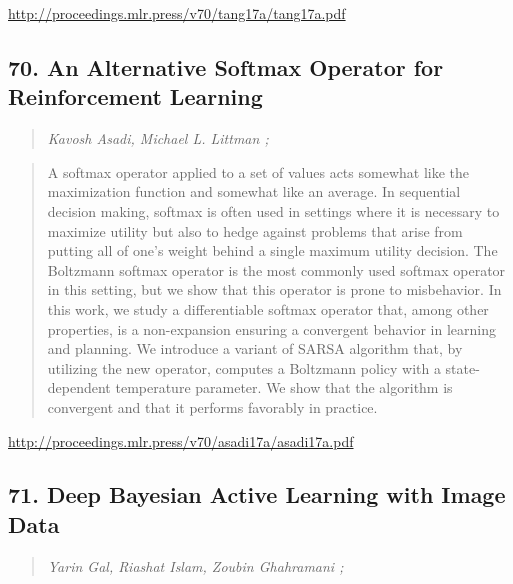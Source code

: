 \documentclass{article}
\begin{document}
\href{http://proceedings.mlr.press/v70/tang17a/tang17a.pdf}{http://proceedings.mlr.press/v70/tang17a/tang17a.pdf}

\subsection{70. An Alternative Softmax Operator for Reinforcement Learning}

\begin{quote}
\footnotesize{\textit{Kavosh Asadi, Michael L. Littman ;}}

\end{quote}

\begin{quote}
    A softmax operator applied to a set of values acts somewhat like the maximization function and somewhat like an average. In sequential decision making, softmax is often used in settings where it is necessary to maximize utility but also to hedge against problems that arise from putting all of one’s weight behind a single maximum utility decision. The Boltzmann softmax operator is the most commonly used softmax operator in this setting, but we show that this operator is prone to misbehavior. In this work, we study a differentiable softmax operator that, among other properties, is a non-expansion ensuring a convergent behavior in learning and planning. We introduce a variant of SARSA algorithm that, by utilizing the new operator, computes a Boltzmann policy with a state-dependent temperature parameter. We show that the algorithm is convergent and that it performs favorably in practice.  
\end{quote}

\href{http://proceedings.mlr.press/v70/asadi17a/asadi17a.pdf}{http://proceedings.mlr.press/v70/asadi17a/asadi17a.pdf}

\subsection{71. Deep Bayesian Active Learning with Image Data}

\begin{quote}
\footnotesize{\textit{Yarin Gal, Riashat Islam, Zoubin Ghahramani ;}}

\end{quote}
\end{document}
